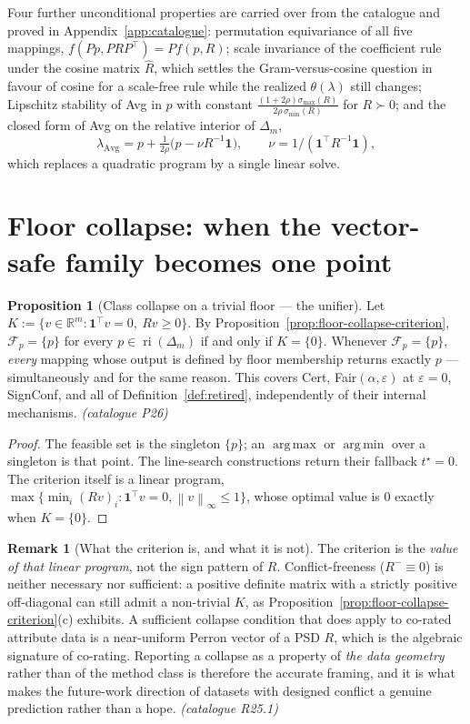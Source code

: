 \documentclass[12pt,a4paper]{report}
\newcommand{\R}{\mathbb{R}}
\newcommand{\1}{\mathbf{1}}
\newcommand{\norm}[1]{\left\lVert #1 \right\rVert}
\newcommand{\Floor}{\mathcal{F}_{p}}
\DeclareMathOperator*{\argmax}{arg\,max}
\DeclareMathOperator*{\argmin}{arg\,min}
\DeclareMathOperator{\ri}{ri}
\theoremstyle{definition}
\newtheorem{remark}[definition]{Remark}
\newtheorem{proposition}[definition]{Proposition}
\begin{document}
Four further unconditional properties are carried over from the catalogue and proved in Appendix~\ref{app:catalogue}: permutation equivariance of all five mappings, \(f(Pp,PRP^\top)=P f(p,R)\); scale invariance of the coefficient rule under the cosine matrix \(\hat R\), which settles the Gram-versus-cosine question in favour of cosine for a scale-free rule while the realized \(\theta(\lambda)\) still changes; Lipschitz stability of Avg in \(p\) with constant \(\tfrac{(1+2\rho)\sigma_{\max}(R)}{2\rho\,\sigma_{\min}(R)}\) for \(R\succ0\); and the closed form of Avg on the relative interior of \(\Delta_m\),
\[
\lambda_{\mathrm{Avg}}=p+\tfrac{1}{2\rho}\bigl(p-\nu R^{-1}\1\bigr),
\qquad \nu=1/(\1^\top R^{-1}\1),
\]
which replaces a quadratic program by a single linear solve.

\section{Floor collapse: when the vector-safe family becomes one point}
\label{sec:floor-collapse}

\begin{proposition}[Class collapse on a trivial floor --- the unifier]
\label{prop:class-collapse}
Let \(K:=\{v\in\R^m:\1^\top v=0,\ Rv\ge0\}\). By Proposition~\ref{prop:floor-collapse-criterion}, \(\Floor=\{p\}\) for every \(p\in\ri(\Delta_m)\) if and only if \(K=\{0\}\). Whenever \(\Floor=\{p\}\), \emph{every} mapping whose output is defined by floor membership returns exactly \(p\) --- simultaneously and for the same reason. This covers Cert, Fair\((\alpha,\varepsilon)\) at \(\varepsilon=0\), SignConf, and all of Definition~\ref{def:retired}, independently of their internal mechanisms. \emph{(catalogue P26)}
\end{proposition}

\begin{proof}
The feasible set is the singleton \(\{p\}\); an \(\argmax\) or \(\argmin\) over a singleton is that point. The line-search constructions return their fallback \(t^\star=0\). The criterion itself is a linear program, \(\max\{\min_i(Rv)_i:\1^\top v=0,\norm{v}_\infty\le1\}\), whose optimal value is \(0\) exactly when \(K=\{0\}\).
\end{proof}

\begin{remark}[What the criterion is, and what it is not]
\label{rem:lp-criterion}
The criterion is the \emph{value of that linear program}, not the sign pattern of \(R\). Conflict-freeness (\(R^-\equiv0\)) is neither necessary nor sufficient: a positive definite matrix with a strictly positive off-diagonal can still admit a non-trivial \(K\), as Proposition~\ref{prop:floor-collapse-criterion}(c) exhibits. A sufficient collapse condition that does apply to co-rated attribute data is a near-uniform Perron vector of a PSD \(R\), which is the algebraic signature of co-rating. Reporting a collapse as a property of \emph{the data geometry} rather than of the method class is therefore the accurate framing, and it is what makes the future-work direction of datasets with designed conflict a genuine prediction rather than a hope. \emph{(catalogue R25.1)}
\end{remark}
\end{document}
